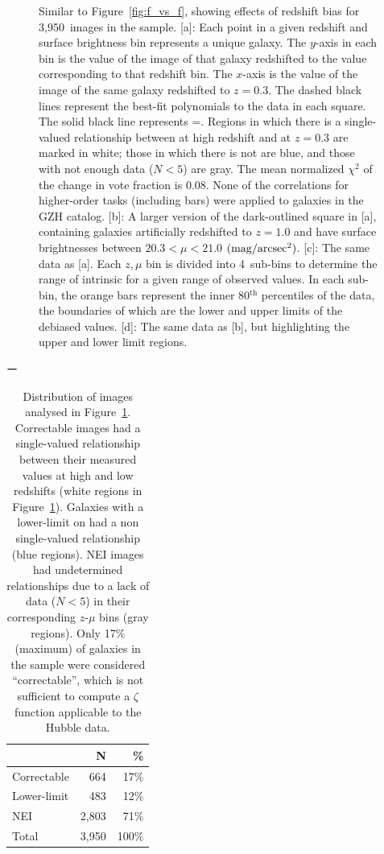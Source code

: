 \documentclass[twocolumn]{aastex6}
\begin{document}
\begin{figure}
\caption{Similar to Figure~\ref{fig:f_vs_f}, showing effects of redshift bias for 3,950~images in the \ferengi{} sample. [a]: Each point in a given redshift and surface brightness bin represents a unique galaxy. The $y$-axis in each bin is the \ffeatures{} value of the image of that galaxy redshifted to the value corresponding to that redshift bin. The $x$-axis is the \ffeatures{} value of the image of the same galaxy redshifted to $z=0.3$. The dashed black lines represent the best-fit polynomials to the data in each square. The solid black line represents \ffeaturesz=\ffeaturesrest. Regions in which there is a single-valued relationship between \ffeatures{} at high redshift and at $z=0.3$ are marked in white; those in which there is not are blue, and those with not enough data ($N<5$) are gray. The mean normalized $\chi^2$ of the change in vote fraction is 0.08. None of the correlations for higher-order tasks (including bars) were applied to galaxies in the GZH catalog. [b]: A larger version of the dark-outlined square in [a], containing \ferengi{} galaxies artificially redshifted to $z=1.0$ and have surface brightnesses between $20.3 < \mu < 21.0$ $\rm (mag/arcsec^2)$. [c]: The same data as [a]. Each $z,\mu$ bin is divided into 4~sub-bins to determine the range of intrinsic \ffeaturesrest{} for a given range of observed \ffeaturesz{} values. In each sub-bin, the orange bars represent the inner 80$^\mathrm{th}$ percentiles of the data, the boundaries of which are the lower and upper limits of the debiased values. [d]: The same data as [b], but highlighting the upper and lower limit regions.}
\label{fig:f_vs_fbar}
\end{figure}

\begin{table}ー
\label{tbl:ferengi_bar}
\caption{Distribution of \ferengi{} images analysed in Figure~\ref{fig:f_vs_fbar}. Correctable images had a single-valued relationship between their measured \fbar{} values at high and low redshifts (white regions in Figure~\ref{fig:f_vs_fbar}). Galaxies with a lower-limit on \fbar{} had a non single-valued relationship (blue regions). NEI images had undetermined relationships due to a lack of data ($N<5$) in their corresponding $z$-$\mu$ bins (gray regions). Only 17\% (maximum) of \ferengi{} galaxies in the sample were considered ``correctable'', which is not sufficient to compute a $\zeta$ function applicable to the Hubble data.   \label{tbl:ferengi_bar_corrections}}
\begin{tabular}{lrr}
\hline \hline
				                   & N       & \% \\
\hline 
Correctable                        & 664   & 17\% \\
Lower-limit                        & 483   & 12\% \\
NEI                                & 2,803     & 71\%\\
Total                              & 3,950   & 100\% \\
\hline \hline
\end{tabular}
\end{table}
\end{document}
